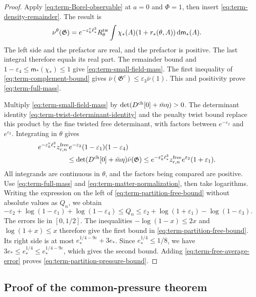 \documentclass[11pt,letterpaper,reqno]{amsart}
\newcommand{\dd}{\mathrm d}
\begin{document}
\begin{proof}
Apply \eqref{eq:term-Borel-observable} at $a=0$ and
$\Phi=1$, then insert \eqref{eq:term-density-remainder}.
The result is
\[
 \nu^\theta(\mathfrak G)=
 e^{-\varepsilon_k^{\rm v}\ell_*^3}R_\theta^{\rm tw}
       \int\chi_*(A)(1+r_*(\theta,A))\,\dd\mathsf m_*(A).
\]
The left side and the prefactor are real, and the
prefactor is positive. The last integral therefore
equals its real part.
The remainder bound and
$1-\varepsilon_4\le\mathsf m_*(\chi_*)\le1$
give \eqref{eq:term-small-field-mass}.
The first inequality of \eqref{eq:term-complement-bound}
gives
$\bar\nu(\mathfrak G^c)\le\varepsilon_3\bar\nu(1)$.
This and positivity prove \eqref{eq:term-full-mass}.

Multiply \eqref{eq:term-small-field-mass} by
$\det(D^{\rm ch}[0]+\bar m\eta)>0$.
The determinant identity
\eqref{eq:term-twist-determinant-identity} and the
penalty twist bound replace this product by the fine
twisted free determinant, with factors between
$e^{-\varepsilon_2}$ and $e^{\varepsilon_2}$.
Integrating in $\theta$ gives
\begin{align*}
 &e^{-\varepsilon_k^{\rm v}\ell_*^3}z_{r,n}^{\rm free}
       e^{-\varepsilon_2}(1-\varepsilon_1)(1-\varepsilon_4)
 \\
 &\hspace{15mm}\le
     \det(D^{\rm ch}[0]+\bar m\eta)\bar\nu(\mathfrak G)
 \le e^{-\varepsilon_k^{\rm v}\ell_*^3}z_{r,n}^{\rm free}
                              e^{\varepsilon_2}(1+\varepsilon_1).
\end{align*}
All integrands are continuous in $\theta$, and the
factors being compared are positive.
Use \eqref{eq:term-full-mass} and
\eqref{eq:term-matter-normalization}, then take logarithms.
Writing the expression on the left of
\eqref{eq:term-partition-free-bound} without absolute
values as $Q_n$, we obtain
\[
 -\varepsilon_2+\log(1-\varepsilon_1)+\log(1-\varepsilon_4)
 \le Q_n\le
 \varepsilon_2+\log(1+\varepsilon_1)-\log(1-\varepsilon_3).
\]
The errors lie in $[0,1/2]$. The inequalities
$-\log(1-x)\le2x$ and $\log(1+x)\le x$ therefore give
the first bound in \eqref{eq:term-partition-free-bound}.
Its right side is at most
$e_*^{1/4-9\varepsilon}+3e_*$.
Since $e_*^{1/4}\le1/8$, we have
$3e_*\le e_*^{1/4}\le e_*^{1/4-9\varepsilon}$,
which gives the second bound.
Adding \eqref{eq:term-free-average-error} proves
\eqref{eq:term-partition-pressure-bound}.
\end{proof}

\subsection{Proof of the common-pressure theorem}
\label{subsec:tpm-common-proof}
\end{document}

